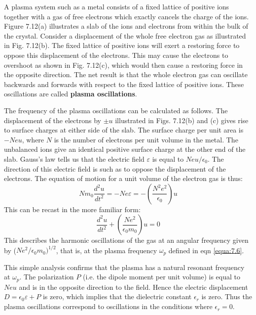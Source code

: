 \documentclass[12pt]{book}
\begin{document}
A plasma system such as a metal consists of a fixed lattice of positive ions together with a gas of free electrons which exactly cancels the charge of the ions. Figure 7.12(a) illustrates a slab of the ions and electrons from within the bulk of the crystal. Consider a displacement of the whole free electron gas as illustrated in Fig. 7.12(b). The fixed lattice of positive ions will exert a restoring force to oppose this displacement of the electrons. This may cause the electrons to overshoot as shown in Fig. 7.12(c), which would then cause a restoring force in the opposite direction. The net result is that the whole electron gas can oscillate backwards and forwards with respect to the fixed lattice of positive ions. These oscillations are called \textbf{plasma oscillations}.

The frequency of the plasma oscillations can be calculated as follows. The displacement of the electrons by $\pm u$ illustrated in Figs. 7.12(b) and (c) gives rise to surface charges at either side of the slab. The surface charge per unit area is $-Neu$, where $N$ is the number of electrons per unit volume in the metal. The unbalanced ions give an identical positive surface charge at the other end of the slab. Gauss's law tells us that the electric field $\varepsilon$ is equal to $Neu/\epsilon_0$. The direction of this electric field is such as to oppose the displacement of the  electrons. The equation of motion for a unit volume of the electron gas is thus:
\begin{equation}\label{equa:7.31}
  Nm_0\frac{d^2u}{dt^2}=-Ne\varepsilon=-\left(\frac{N^2e^2}{\epsilon_0}\right)u
\end{equation}
This can be recast in the more familiar form:
\begin{equation}\label{equa:7.32}
  \frac{d^2u}{dt^2}+\left(\frac{Ne^2}{\epsilon_0m_0}\right)u=0
\end{equation}
This describes the harmonic oscillations of the gas at an angular frequency given by ($Ne^2/\epsilon_0m_0)^{1/2}$, that is, at the plasma frequency $\omega_p$ defined in eqn \ref{equa:7.6}.

This simple analysis confirms that the plasma has a natural resonant frequency at $\omega_p$. The polarization $P$ (i.e. the dipole moment per unit volume) is equal to $Neu$ and is in the opposite direction to the field. Hence the electric displacement $D = \epsilon_0\varepsilon + P$ is zero, which implies that the dielectric constant $\epsilon_r$ is zero. Thus the plasma oscillations correspond to oscillations in the conditions where $\epsilon_r= 0$.
\end{document}
